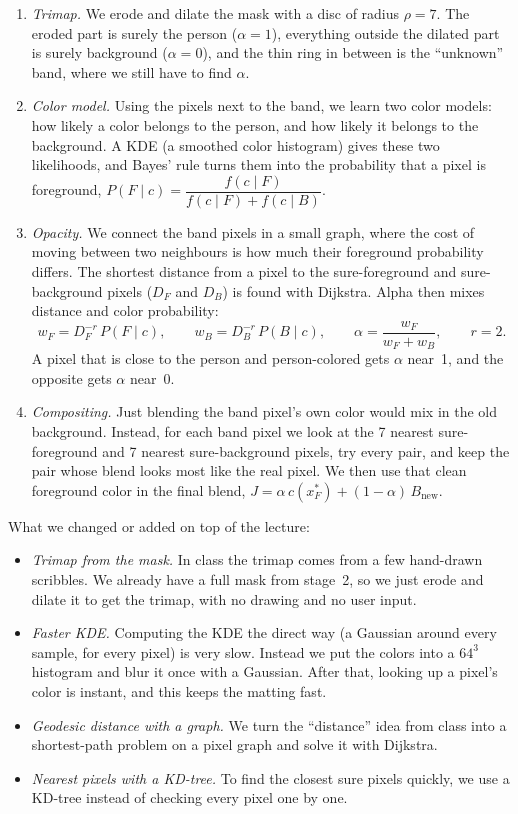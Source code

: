 \documentclass[11pt]{article}
\begin{document}
\begin{enumerate}[nosep]
    \item \emph{Trimap.} We erode and dilate the mask with a disc of radius $\rho=7$. The eroded part
    is surely the person ($\alpha=1$), everything outside the dilated part is surely background
    ($\alpha=0$), and the thin ring in between is the ``unknown'' band, where we still have to find
    $\alpha$.
    \item \emph{Color model.} Using the pixels next to the band, we learn two color models: how
    likely a color belongs to the person, and how likely it belongs to the background. A KDE (a
    smoothed color histogram) gives these two likelihoods, and Bayes' rule turns them into the
    probability that a pixel is foreground,
    $P(F\mid c)=\dfrac{f(c\mid F)}{f(c\mid F)+f(c\mid B)}$.
    \item \emph{Opacity.} We connect the band pixels in a small graph, where the cost of moving
    between two neighbours is how much their foreground probability differs. The shortest distance
    from a pixel to the sure-foreground and sure-background pixels ($D_F$ and $D_B$) is found with
    Dijkstra. Alpha then mixes distance and color probability:
    \[
        w_F=D_F^{-r}\,P(F\mid c),\qquad w_B=D_B^{-r}\,P(B\mid c),\qquad
        \alpha=\frac{w_F}{w_F+w_B},\qquad r=2.
    \]
    A pixel that is close to the person and person-colored gets $\alpha$ near~1, and the opposite
    gets $\alpha$ near~0.
    \item \emph{Compositing.} Just blending the band pixel's own color would mix in the old
    background. Instead, for each band pixel we look at the 7 nearest sure-foreground and 7 nearest
    sure-background pixels, try every pair, and keep the pair whose blend looks most like the real
    pixel. We then use that clean foreground color in the final blend,
    $J=\alpha\,c(x_F^{*})+(1-\alpha)\,B_\text{new}$.
\end{enumerate}

\noindent
What we changed or added on top of the lecture:

\begin{itemize}[nosep]
    \item \emph{Trimap from the mask.} In class the trimap comes from a few hand-drawn scribbles. We
    already have a full mask from stage~2, so we just erode and dilate it to get the trimap, with no
    drawing and no user input.
    \item \emph{Faster KDE.} Computing the KDE the direct way (a Gaussian around every sample, for
    every pixel) is very slow. Instead we put the colors into a $64^3$ histogram and blur it once
    with a Gaussian. After that, looking up a pixel's color is instant, and this keeps the
    matting fast.
    \item \emph{Geodesic distance with a graph.} We turn the ``distance'' idea from class into a
    shortest-path problem on a pixel graph and solve it with Dijkstra.
    \item \emph{Nearest pixels with a KD-tree.} To find the closest sure pixels quickly, we use a
    KD-tree instead of checking every pixel one by one.
\end{itemize}
\end{document}
